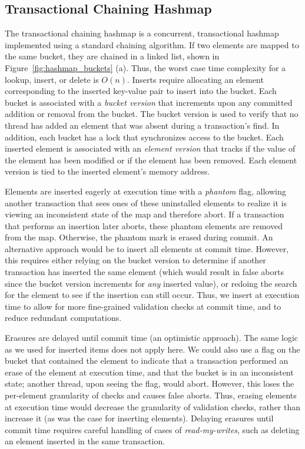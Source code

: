 \subsection{Transactional Chaining Hashmap}
The transactional chaining hashmap is a concurrent, transactional hashmap implemented using a standard chaining algorithm. If two elements are mapped to the same bucket, they are chained in a linked list, shown in Figure~\ref{fig:hashmap_buckets} (a). Thus, the worst case time complexity for a lookup, insert, or delete is $O(n)$. Inserts require allocating an element corresponding to the inserted key-value pair to insert into the bucket. Each bucket is associated with a \emph{bucket version} that increments upon any committed addition or removal from the bucket. The bucket version is used to verify that no thread has added an element that was absent during a transaction's find. In addition, each bucket has a lock that synchronizes access to the bucket. Each inserted element is associated with an \emph{element version} that tracks if the value of the element has been modified or if the element has been removed. Each element version is tied to the inserted element's memory address.

Elements are inserted eagerly at execution time with a \emph{phantom} flag, allowing another transaction that sees ones of these uninstalled elements to realize it is viewing an inconsistent state of the map and therefore abort. If a transaction that performs an insertion later aborts, these phantom elements are removed from the map. Otherwise, the phantom mark is erased during commit. An alternative approach would be to insert all elements at commit time. However, this requires either relying on the bucket version to determine if another transaction has inserted the same element (which would result in false aborts since the bucket version increments for \emph{any} inserted value), or redoing the search for the element to see if the insertion can still occur. Thus, we insert at execution time to allow for more fine-grained validation checks at commit time, and to reduce redundant computations. 

Erasures are delayed until commit time (an optimistic approach). The same logic as we used for inserted items does not apply here. We could also use a flag on the bucket that contained the element to indicate that a transaction performed an erase of the element at execution time, and that the bucket is in an inconsistent state; another thread, upon seeing the flag, would abort. However, this loses the per-element granularity of checks and causes false aborts. Thus, erasing elements at execution time would decrease the granularity of validation checks, rather than increase it (as was the case for inserting elements).
Delaying erasures until commit time requires careful handling of cases of \emph{read-my-writes}, such as deleting an element inserted in the same transaction.

